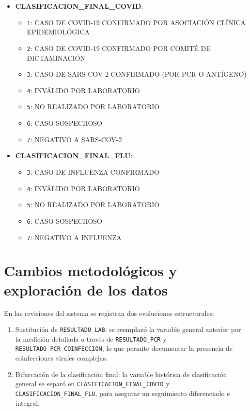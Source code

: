 \begin{itemize}
    \item \textbf{CLASIFICACION\_FINAL\_COVID}:
        \begin{itemize}
            \item \texttt{1}: CASO DE COVID-19 CONFIRMADO POR ASOCIACIÓN CLÍNICA EPIDEMIOLÓGICA
            \item \texttt{2}: CASO DE COVID-19 CONFIRMADO POR COMITÉ DE DICTAMINACIÓN
            \item \texttt{3}: CASO DE SARS-COV-2 CONFIRMADO (POR PCR O ANTÍGENO)
            \item \texttt{4}: INVÁLIDO POR LABORATORIO
            \item \texttt{5}: NO REALIZADO POR LABORATORIO
            \item \texttt{6}: CASO SOSPECHOSO
            \item \texttt{7}: NEGATIVO A SARS-COV-2
        \end{itemize}

    \item \textbf{CLASIFICACION\_FINAL\_FLU}:
        \begin{itemize}
            \item \texttt{3}: CASO DE INFLUENZA CONFIRMADO
            \item \texttt{4}: INVÁLIDO POR LABORATORIO
            \item \texttt{5}: NO REALIZADO POR LABORATORIO
            \item \texttt{6}: CASO SOSPECHOSO
            \item \texttt{7}: NEGATIVO A INFLUENZA
        \end{itemize}
\end{itemize}

\section{Cambios metodológicos y exploración de los datos}

En las revisiones del sistema se registran dos evoluciones estructurales:
\begin{enumerate}
    \item Sustitución de \texttt{RESULTADO\_LAB}: se reemplazó la variable general anterior por la medición detallada a través de \texttt{RESULTADO\_PCR} y \texttt{RESULTADO\_PCR\_COINFECCION}, lo que permite documentar la presencia de coinfecciones virales complejas.
    \item Bifurcación de la clasificación final: la variable histórica de clasificación general se separó en \texttt{CLASIFICACION\_FINAL\_COVID} y \texttt{CLASIFICACION\_FINAL\_FLU}, para asegurar un seguimiento diferenciado e integral.
\end{enumerate}

